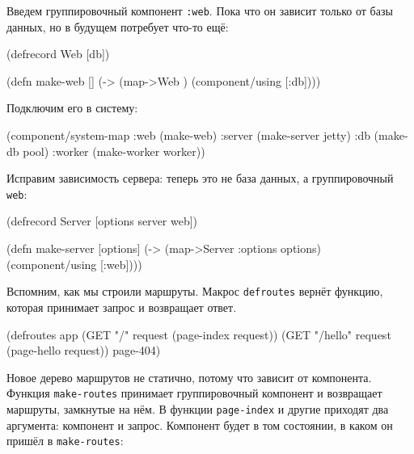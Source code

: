 Введем группировочный компонент \verb|:web|. Пока что он зависит только от
базы данных, но в будущем потребует что-то ещё:

\begin{english}
  \begin{clojure}
(defrecord Web [db])

(defn make-web []
  (-> (map->Web {})
      (component/using [:db])))
  \end{clojure}
\end{english}

\noindent
Подключим его в систему:

\begin{english}
  \begin{clojure}
(component/system-map
 :web    (make-web)
 :server (make-server jetty)
 :db     (make-db pool)
 :worker (make-worker worker))
  \end{clojure}
\end{english}


Исправим зависимость сервера: теперь это не база данных, а группировочный
\verb|web|:

\begin{english}
  \begin{clojure}
(defrecord Server
  [options server web])

(defn make-server
  [options]
  (-> (map->Server {:options options})
      (component/using [:web])))
  \end{clojure}
\end{english}


Вспомним, как мы строили маршруты. Макрос \verb|defroutes| вернёт функцию,
которая принимает запрос и возвращает ответ.

\begin{english}
  \begin{clojure}
(defroutes app
  (GET "/"      request (page-index request))
  (GET "/hello" request (page-hello request))
  page-404)
  \end{clojure}
\end{english}

Новое дерево маршрутов не статично, потому что зависит от компонента. Функция
\verb|make-routes| принимает группировочный компонент и возвращает маршруты,
замкнутые на нём. В функции \verb|page-index| и другие приходят два аргумента:
компонент и запрос. Компонент будет в том состоянии, в каком он пришёл в
\verb|make-routes|:

